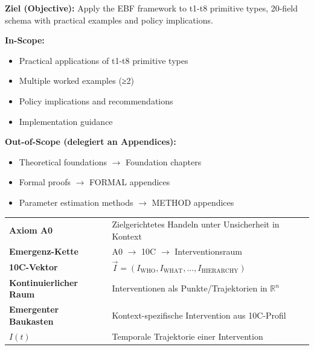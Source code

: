 \begin{tcolorbox}[
    colback=purple!5!white,
    colframe=purple!75!black,
    title={\textbf{Chapter Scope: Ziel / In-Scope / Out-of-Scope}},
    fonttitle=\bfseries
]

\textbf{Ziel (Objective):}
Apply the EBF framework to t1-t8 primitive types, 20-field schema with practical examples and policy implications.

\vspace{0.3cm}
\textbf{In-Scope:}
\begin{itemize}[nosep]
    \item Practical applications of t1-t8 primitive types
    \item Multiple worked examples (≥2)
    \item Policy implications and recommendations
    \item Implementation guidance
\end{itemize}

\vspace{0.3cm}
\textbf{Out-of-Scope (delegiert an Appendices):}
\begin{itemize}[nosep]
    \item Theoretical foundations $\rightarrow$ Foundation chapters
    \item Formal proofs $\rightarrow$ FORMAL appendices
    \item Parameter estimation methods $\rightarrow$ METHOD appendices
\end{itemize}

\end{tcolorbox}



\begin{tcolorbox}[colback=blue!5!white, colframe=blue!75!black,
    title=Zentrale Begriffe in diesem Kapitel]
\small
\begin{tabular}{@{}ll@{}}
\textbf{Axiom A0} & Zielgerichtetes Handeln unter Unsicherheit in Kontext \\
\textbf{Emergenz-Kette} & A0 $\rightarrow$ 10C $\rightarrow$ Interventionsraum \\
\textbf{10C-Vektor} & $\vec{I} = (I_{\text{WHO}}, I_{\text{WHAT}}, ..., I_{\text{HIERARCHY}})$ \\
\textbf{Kontinuierlicher Raum} & Interventionen als Punkte/Trajektorien in $\mathbb{R}^n$ \\
\textbf{Emergenter Baukasten} & Kontext-spezifische Intervention aus 10C-Profil \\
\textbf{$I(t)$} & Temporale Trajektorie einer Intervention \\
\end{tabular}
\end{tcolorbox}

